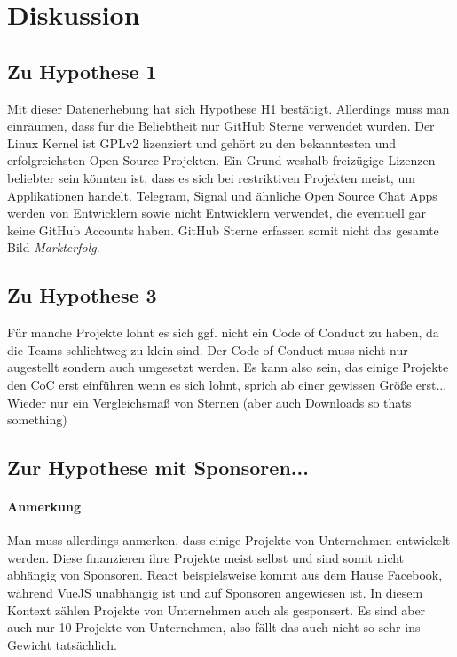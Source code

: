 \chapter{Diskussion}




\section{Zu Hypothese 1}
Mit dieser Datenerhebung hat sich \hyperref[H:1]{Hypothese H1} bestätigt. Allerdings muss man einräumen,
dass für die Beliebtheit nur GitHub Sterne verwendet wurden. Der Linux Kernel ist GPLv2 lizenziert und 
gehört zu den bekanntesten und erfolgreichsten Open Source Projekten. 
Ein Grund weshalb freizügige Lizenzen beliebter sein könnten ist, dass es sich bei restriktiven 
Projekten meist, um Applikationen handelt. Telegram, Signal und ähnliche Open Source Chat Apps 
werden von Entwicklern sowie nicht Entwicklern verwendet, die eventuell gar keine GitHub Accounts haben.
GitHub Sterne erfassen somit nicht das gesamte Bild \textit{Markterfolg}.

\section{Zu Hypothese 3}
Für manche Projekte lohnt es sich ggf. nicht ein Code of Conduct zu haben, da die Teams schlichtweg 
zu klein sind. Der Code of Conduct muss nicht nur augestellt sondern auch umgesetzt werden.
Es kann also sein, das einige Projekte den CoC erst einführen wenn es sich lohnt, sprich ab einer 
gewissen Größe erst...
Wieder nur ein Vergleichsmaß von Sternen (aber auch Downloads so thats something)

\section{Zur Hypothese mit Sponsoren...}
\subsubsection*{Anmerkung}
Man muss allerdings anmerken, dass einige Projekte von Unternehmen entwickelt werden. Diese finanzieren 
ihre Projekte meist selbst und sind somit nicht abhängig von Sponsoren. 
React beispielsweise kommt aus dem Hause Facebook, während VueJS unabhängig ist und auf Sponsoren angewiesen ist.
In diesem Kontext zählen Projekte von Unternehmen auch als gesponsert.
Es sind aber auch nur 10 Projekte von Unternehmen, also fällt das auch nicht so sehr ins Gewicht tatsächlich.


